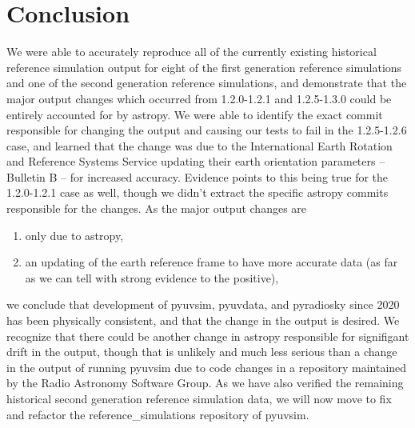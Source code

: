 \documentclass[]{article}
\begin{document}
\section{Conclusion}

We were able to accurately reproduce all of the currently existing historical reference simulation output for eight of the first generation reference simulations and one of the second generation reference simulations, and demonstrate that the major output changes which occurred from 1.2.0-1.2.1 and 1.2.5-1.3.0 could be entirely accounted for by astropy. We were able to identify the exact commit responsible for changing the output and causing our tests to fail in the 1.2.5-1.2.6 case, and learned that the change was due to the International Earth Rotation and Reference Systems Service updating their earth orientation parameters -- Bulletin B -- for increased accuracy. Evidence points to this being true for the 1.2.0-1.2.1 case as well, though we didn't extract the specific astropy commits responsible for the changes. As the major output changes are
\begin{enumerate}[label=(\alph*)]
    \item only due to astropy,
    \item an updating of the earth reference frame to have more accurate data (as far as we can tell with strong evidence to the positive),
\end{enumerate}
we conclude that development of pyuvsim, pyuvdata, and pyradiosky since 2020 has been physically consistent, and that the change in the output is desired. We recognize that there could be another change in astropy responsible for signifigant drift in the output, though that is unlikely and much less serious than a change in the output of running pyuvsim due to code changes in a repository maintained by the Radio Astronomy Software Group. As we have also verified the remaining historical second generation reference simulation data, we will now move to fix and refactor the reference\_simulations repository of pyuvsim.
\end{document}
